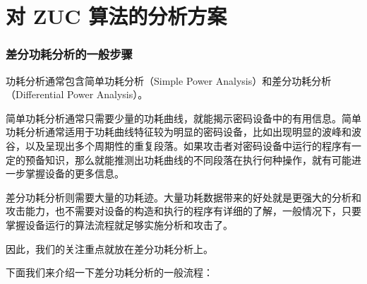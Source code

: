 \chapter{对 ZUC 算法的分析方案}
\label{chap:attack}

\subsection{差分功耗分析的一般步骤}
\label{sec:dpa}
功耗分析通常包含简单功耗分析（Simple Power Analysis）和差分功耗分析（Differential Power Analysis）。

简单功耗分析通常只需要少量的功耗曲线，就能揭示密码设备中的有用信息。简单功耗分析通常适用于功耗曲线特征较为明显的密码设备，比如出现明显的波峰和波谷，以及呈现出多个周期性的重复段落。如果攻击者对密码设备中运行的程序有一定的预备知识，那么就能推测出功耗曲线的不同段落在执行何种操作，就有可能进一步掌握设备的更多信息。

差分功耗分析则需要大量的功耗迹。大量功耗数据带来的好处就是更强大的分析和攻击能力，也不需要对设备的构造和执行的程序有详细的了解，一般情况下，只要掌握设备运行的算法流程就足够实施分析和攻击了。

因此，我们的关注重点就放在差分功耗分析上。

\vspace*{0.5\baselineskip}

下面我们来介绍一下差分功耗分析的一般流程：\cite{paa_cn}

